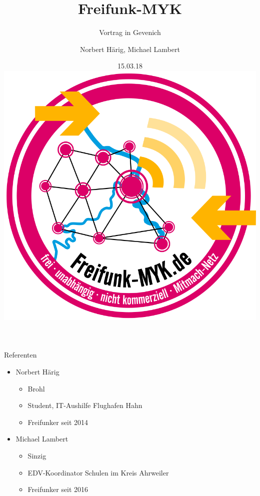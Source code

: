 \documentclass{beamer}
\begin{document}
\title[]{Freifunk-MYK}
\subtitle[Freifunk-MYK]{Vortrag in Gevenich}
\author[Freifunk-MYK]{Norbert Härig, Michael Lambert}
\date{15.03.18\\\vspace{0.5cm} \includegraphics[scale=0.1]{Bilder/Logo.png}}
\institute{}

\begin{frame}
\titlepage	
\end{frame}
\begin{frame}{Referenten}
\begin{itemize}
	\item Norbert Härig
	\begin{itemize}
		\item Brohl
		\item Student, IT-Aushilfe Flughafen Hahn
		\item Freifunker seit 2014
	\end{itemize}
\end{itemize}
\begin{itemize}
	\item Michael Lambert
	\begin{itemize}
		\item Sinzig
		\item EDV-Koordinator Schulen im Kreis Ahrweiler
		\item Freifunker seit 2016
	\end{itemize}
\end{itemize}
\end{frame}
\end{document}
